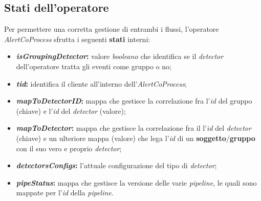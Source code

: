 \subsection{Stati dell'operatore}\label{sec:stati-alertcoprocess}
Per permettere una corretta gestione di entrambi i flussi, l'operatore \textit{AlertCoProcess} sfrutta i seguenti \textbf{stati} interni:
\begin{itemize}
		\item{\textbf{\textit{isGroupingDetector}:} valore \textit{booleano} che identifica se il \textit{detector} dell'operatore tratta gli eventi come gruppo o no;}
		\item{\textbf{\textit{tid}:} identifica il cliente all'interno dell'\textit{AlertCoProcess};}
		\item{\textbf{\textit{mapToDetectorID}:} mappa che gestisce la correlazione fra l'\textit{id} del gruppo (chiave) e l'\textit{id} del \textit{detector} (valore);}
		\item{\textbf{\textit{mapToDetector}:} mappa che gestisce la correlazione fra il l'\textit{id} del \textit{detector} (chiave) e un ulteriore mappa (valore) che lega l'\textit{id} di un \textbf{soggetto}/\textbf{gruppo} con il suo vero e proprio \textit{detector};}
		\item{\textbf{\textit{detectorsConfigs}:} l'attuale configurazione del tipo di \textit{detector};}
		\item{\textbf{\textit{pipeStatus}:} mappa che gestisce la versione delle varie \textit{\gls{pipeline}}, le quali sono mappate per l'\textit{id} della \textit{\gls{pipeline}}.}
\end{itemize}

